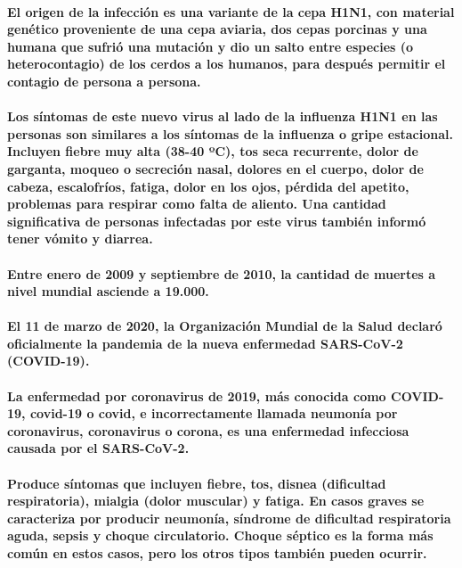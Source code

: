 \documentclass[a4paper,11pt,twocolumn]{article}
\begin{document}
\paragraph{El origen de la infección es una variante de la cepa H1N1, con material genético proveniente de una cepa aviaria, dos cepas porcinas y una humana que sufrió una mutación y dio un salto entre especies (o heterocontagio) de los cerdos a los humanos, para después permitir el contagio de persona a persona.}
\paragraph{Los síntomas de este nuevo virus al lado de la influenza H1N1 en las personas son similares a los síntomas de la influenza o gripe estacional. Incluyen fiebre muy alta (38-40 ºC), tos seca recurrente, dolor de garganta, moqueo o secreción nasal, dolores en el cuerpo, dolor de cabeza, escalofríos, fatiga, dolor en los ojos, pérdida del apetito, problemas para respirar como falta de aliento. Una cantidad significativa de personas infectadas por este virus también informó tener vómito y diarrea.}
\paragraph{Entre enero de 2009 y septiembre de 2010, la cantidad de muertes a nivel mundial asciende a 19.000\cite{h1n1-overview}.}
\paragraph{El 11 de marzo de 2020, la Organización Mundial de la Salud declaró oficialmente la pandemia de la nueva enfermedad SARS-CoV-2 (COVID-19).}
\paragraph{La enfermedad por coronavirus de 2019, más conocida como COVID-19, covid-19 o covid, e incorrectamente llamada neumonía por coronavirus, coronavirus o corona, es una enfermedad infecciosa causada por el SARS-CoV-2.}
\paragraph{Produce síntomas que incluyen fiebre, tos, disnea (dificultad respiratoria), mialgia (dolor muscular) y fatiga. En casos graves se caracteriza por producir neumonía, síndrome de dificultad respiratoria aguda, sepsis y choque circulatorio. Choque séptico es la forma más común en estos casos, pero los otros tipos también pueden ocurrir.}
\end{document}
